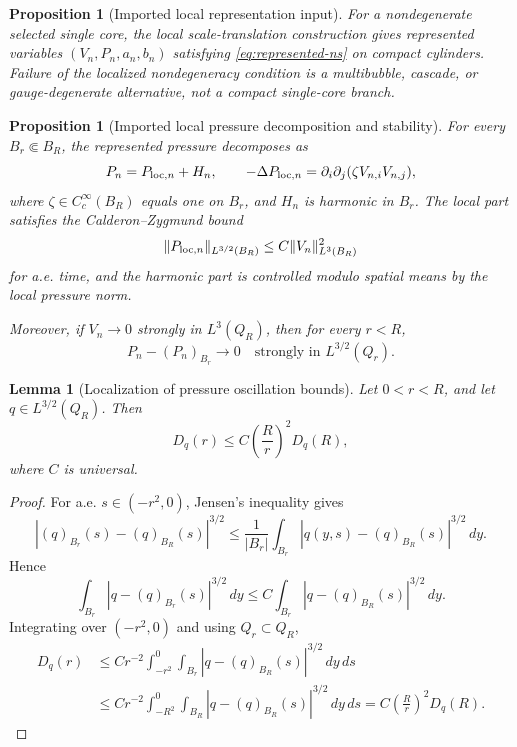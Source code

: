 \documentclass[11pt]{amsart}
\theoremstyle{plain}
\newtheorem{lemma}[theorem]{Lemma}
\newtheorem{proposition}[theorem]{Proposition}
\theoremstyle{definition}
\theoremstyle{remark}
\begin{document}
\begin{proposition}[Imported local representation input]\label{prop:representation-input}
For a nondegenerate selected single core, the local scale-translation
construction gives represented variables \((V_n,P_n,a_n,b_n)\) satisfying
\eqref{eq:represented-ns} on compact cylinders.  Failure of the localized
nondegeneracy condition is a multibubble, cascade, or gauge-degenerate
alternative, not a compact single-core branch.
\end{proposition}

\begin{proposition}[Imported local pressure decomposition and stability]
\label{prop:pressure-reconstruction}
For every \(B_r\Subset B_R\), the represented pressure decomposes as
\[
  P_n=P_{{\rm loc},n}+H_n,
  \qquad
  -\Delta P_{{\rm loc},n}=\partial_i\partial_j(\zeta V_{n,i}V_{n,j}),
\]
where \(\zeta\in C_c^\infty(B_R)\) equals one on \(B_r\), and \(H_n\) is
harmonic in \(B_r\).  The local part satisfies the Calderon--Zygmund bound
\[
  \|P_{{\rm loc},n}\|_{L^{3/2}(B_R)}
  \le C\|V_n\|_{L^3(B_R)}^2
\]
for a.e. time, and the harmonic part is controlled modulo spatial means by the
local pressure norm.

Moreover, if \(V_n\to0\) strongly in \(L^3(Q_R)\), then for every \(r<R\),
\[
  P_n-(P_n)_{B_r}\to0
  \quad\text{strongly in }L^{3/2}(Q_r).
\]
\end{proposition}

\begin{lemma}[Localization of pressure oscillation bounds]\label{lem:D-localization}
Let \(0<r<R\), and let \(q\in L^{3/2}(Q_R)\).  Then
\[
  D_q(r)\le C\left(\frac{R}{r}\right)^2D_q(R),
\]
where \(C\) is universal.
\end{lemma}

\begin{proof}
For a.e. \(s\in(-r^2,0)\), Jensen's inequality gives
\[
  |(q)_{B_r}(s)-(q)_{B_R}(s)|^{3/2}
  \le \frac1{|B_r|}\int_{B_r}|q(y,s)-(q)_{B_R}(s)|^{3/2}\,dy .
\]
Hence
\[
  \int_{B_r}|q-(q)_{B_r}(s)|^{3/2}\,dy
  \le
  C\int_{B_r}|q-(q)_{B_R}(s)|^{3/2}\,dy .
\]
Integrating over \((-r^2,0)\) and using \(Q_r\subset Q_R\),
\[
\begin{aligned}
  D_q(r)
  &\le
  Cr^{-2}\int_{-r^2}^0\int_{B_r}
  |q-(q)_{B_R}(s)|^{3/2}\,dy\,ds \\
  &\le
  Cr^{-2}\int_{-R^2}^0\int_{B_R}
  |q-(q)_{B_R}(s)|^{3/2}\,dy\,ds
  =
  C\left(\frac{R}{r}\right)^2D_q(R).
\end{aligned}
\]
\end{proof}
\end{document}

